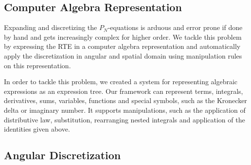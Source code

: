 \subsection{Computer Algebra Representation}

Expanding and discretizing the $P_N$-equations is arduous and error prone if done by hand and gets increasingly complex for higher order. We tackle this problem by expressing the RTE in a computer algebra representation and automatically apply the discretization in angular and spatial domain using manipulation rules on this representation.


\begin{figure}[h]
\centering
\begin{subfigure}{0.45\columnwidth}
\end{subfigure}%
\hspace{0.05\columnwidth}
\begin{subfigure}{0.45\columnwidth}
\end{subfigure}%

\begin{subfigure}{0.45\columnwidth}
\end{subfigure}%
\hspace{0.05\columnwidth}
\begin{subfigure}{0.45\columnwidth}
\end{subfigure}%

\end{figure}

In order to tackle this problem, we created a system for representing algebraic expressions as an expression tree. Our framework can represent terms, integrals, derivatives, sums, variables, functions and special symbols, such as the Kronecker delta or imaginary number. It supports manipulations, such as the application of distributive law, substitution, rearranging nested integrals and application of the identities given above.

\subsection{Angular Discretization}

